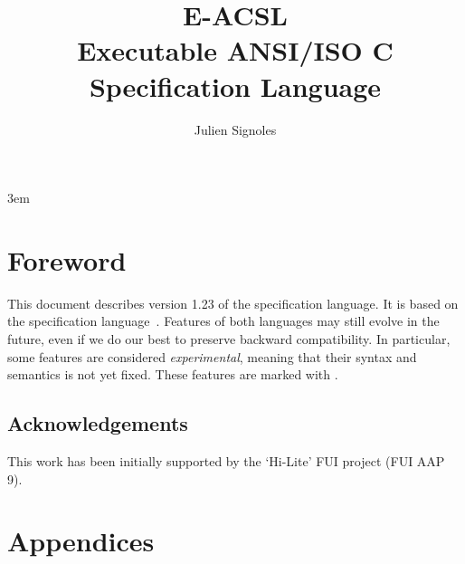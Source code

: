 \documentclass{frama-c-book}
\title{
  \huge %
  E-ACSL \\
  \medskip
  Executable ANSI/ISO C Specification Language
}
\author{Julien Signoles}
\newcommand{\eacsllangversion}{1.23\xspace}
\newcommand{\version}{\eacsllangversion\xspace}
\begin{document}
\sloppy
\emergencystretch 3em

\maketitle

\cleardoublepage
{}
\label{chap:contents}
\tableofcontents

\chapter*{Foreword}

This document describes version \version of the \eacsl specification
language. It is based on the \acsl specification language~\cite{acsl}. Features
of both languages may still evolve in the future, even if we do our best to
preserve backward compatibility. In particular, some features are considered
\emph{experimental}, meaning that their syntax and semantics is not yet fixed.
These features are marked with \experimental.

\section*{Acknowledgements}

\insertpeople

\medskip

This work has been initially supported by the ‘Hi-Lite’ FUI project (FUI AAP 9).










\appendix

\chapter{Appendices}
\label{chap:appendix}



\cleardoublepage
{}



\cleardoublepage
{}
\listoffigures

\cleardoublepage
{}
\printindex
\end{document}
